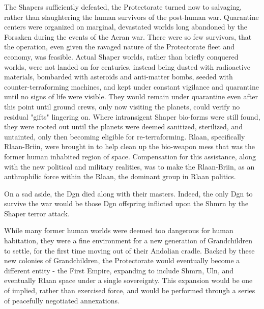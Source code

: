 The Shapers sufficiently defeated, the Protectorate turned now to
salvaging, rather than slaughtering the human survivors of the
post-human war. Quarantine centers were organized on marginal,
devastated worlds long abandoned by the Forsaken during the events of
the Aeran war. There were so few survivors, that the operation, even
given the ravaged nature of the Protectorate fleet and economy, was
feasible. Actual Shaper worlds, rather than briefly conquered worlds,
were not landed on for centuries, instead being dusted with
radioactive materials, bombarded with asteroids and anti-matter bombs,
seeded with counter-terraforming machines, and kept under constant
vigilance and quarantine until no signs of life were visible. They
would remain under quarantine even after this point until ground
crews, only now visiting the planets, could verify no residual "gifts"
lingering on. Where intransigent Shaper bio-forms were still found,
they were rooted out until the planets were deemed sanitized,
sterilized, and untainted, only then becoming eligible for
re-terraforming. Rlaan, specifically Rlaan-Briin, were brought in to
help clean up the bio-weapon mess that was the former human inhabited
region of space. Compensation for this assistance, along with the new
political and military realities, was to make the Rlaan-Briin, as an
anthrophilic force within the Rlaan, the dominant group in Rlaan
politics.

On a sad aside, the Dgn died along with their masters. Indeed, the
only Dgn to survive the war would be those Dgn offspring inflicted upon
the Shmrn by the Shaper terror attack.

While many former human worlds were deemed too dangerous for human
habitation, they were a fine environment for a new generation of
Grandchildren to settle, for the first time moving out of their
Andolian cradle. Backed by these new colonies of Grandchildren, the
Protectorate would eventually become a different entity - the First
Empire, expanding to include Shmrn, Uln, and eventually Rlaan space
under a single sovereignty. This expansion would be one of implied,
rather than exercised force, and would be performed through a series
of peacefully negotiated annexations.

